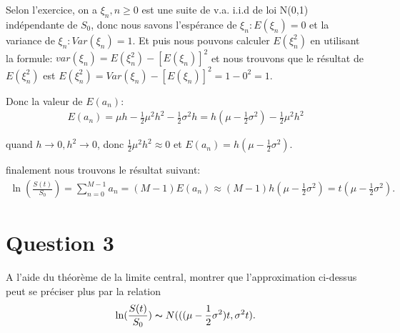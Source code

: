\documentclass[a4paper,10pt]{report}
\begin{document}
\par Selon l'exercice, on a $\xi_{n}, n \geq 0$ est une suite de v.a. i.i.d de loi N(0,1) indépendante de $S_{0}$, donc nous savons l'espérance de $\xi_{n}: E(\xi_{n}) = 0$ et la variance de $\xi_{n}: Var(\xi_{n}) = 1$.  Et puis nous pouvons calculer $E(\xi_{n}^{2})$ en utilisant la formule: $var(\xi_{n}) = E(\xi_{n}^{2}) - [E(\xi_{n})]^{2}$ et nous trouvons que le résultat de $E(\xi_{n}^{2})$ est $E(\xi_{n}^{2}) = Var(\xi_{n}) - [E(\xi_{n})]^{2} = 1 - 0^{2} = 1$.
\par Donc la valeur de $E(a_{n})$:
\begin{align*}
	E(a_{n}) = \mu h -\frac{1}{2} \mu^{2} h^{2} -\frac{1}{2} \sigma^{2} h = h(\mu - \frac{1}{2} \sigma^{2}) -\frac{1}{2} \mu^{2} h^{2}
\end{align*}
\par quand $h \rightarrow 0, h^{2} \rightarrow 0$, donc $\frac{1}{2} \mu^{2} h^{2} \approx 0$ et $E(a_{n}) = h(\mu - \frac{1}{2} \sigma^{2})$.
\par finalement nous trouvons le résultat suivant:
\begin{align*}
		\ln (\frac{S(t)}{S_{0}}) = \sum_{n=0}^{M-1} a_{n} = (M-1) E(a_{n}) \approx (M - 1) h(\mu - \frac{1}{2} \sigma^{2}) = t(\mu - \frac{1}{2} \sigma^{2}).
\end{align*}

\section{Question 3}
\par A l'aide du théorème de la limite central, montrer que l'approximation ci-dessus peut se préciser plus par la relation
\begin{align*}
	\ln (\frac{S(t)}{S_{0}}) \thicksim N(((\mu - \frac{1}{2} \sigma^{2})t, \sigma^{2}t).
\end{align*}
\end{document}
